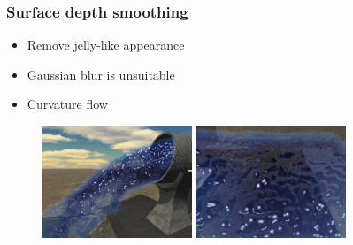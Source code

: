 \documentclass{beamer}
\begin{document}
	\begin{frame}[t]\frametitle{Surface depth smoothing}
	    \begin{itemize}
	    	\item Remove jelly-like appearance
	    	\item Gaussian blur is unsuitable
	    	\item Curvature flow
	    \end{itemize}
	    \begin{figure}
	    	\centering
	    	\includegraphics[width=0.4\textwidth]{gaussian.png} \hspace{1em}
	    	\includegraphics[width=0.4\textwidth]{curvature_water.png}
	    \end{figure}
	\end{frame}
\end{document}
